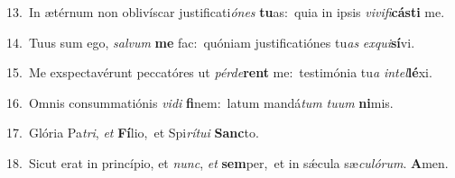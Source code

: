 {\numbfont\textcolor{\numbcolor}{13.}}~In ætérnum non oblivíscar justificati\-\textit{ó}\-\textit{nes} \textbf{tu}\-as:~\star quia in ipsis \textit{vi}\-\textit{vi}\textit{fi}\textbf{cás}\textbf{ti} me.\par
{\numbfont\textcolor{\numbcolor}{14.}}~Tuus sum ego, \textit{sal}\-\textit{vum} \textbf{me} fac:~\star quóniam justificatiónes tu\textit{as} \textit{ex}\-\textit{qui}\textbf{sí}vi.\par
{\numbfont\textcolor{\numbcolor}{15.}}~Me exspectavérunt peccatóres ut \textit{pér}\-\textit{de}\textbf{rent} me:~\star testimónia tu\textit{a} \textit{in}\-\textit{tel}\textbf{lé}xi.\par
{\numbfont\textcolor{\numbcolor}{16.}}~Omnis consummatiónis \textit{vi}\-\textit{di} \textbf{fi}\-nem:~\star latum mandá\textit{tum} \textit{tu}\-\textit{um} \textbf{ni}\-mis.\par
{\numbfont\textcolor{\numbcolor}{17.}}~Glória Pa\-\textit{tri}\-, \textit{et} \textbf{Fí}\-lio,~\star et Spi\-\textit{rí}\-\textit{tu}\textit{i} \textbf{Sanc}\-to.\par
{\numbfont\textcolor{\numbcolor}{18.}}~Sicut erat in princípio, et \textit{nunc}\-, \textit{et} \textbf{sem}\-per,~\star et in sǽcula sæ\-\textit{cu}\-\textit{ló}\textit{rum}. \textbf{A}\-men.\par
